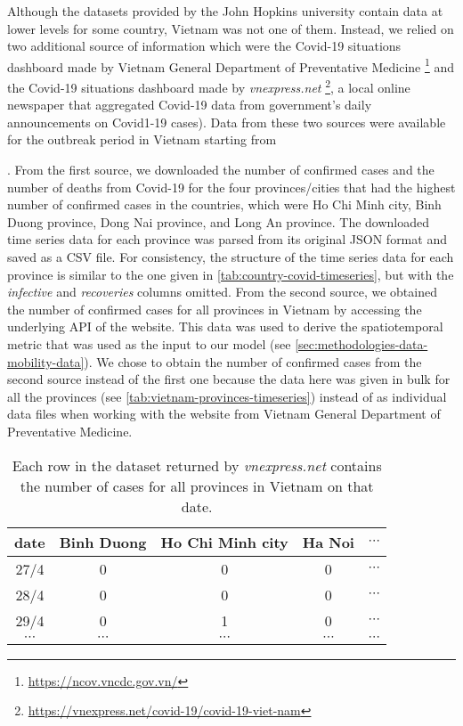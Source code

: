 Although the datasets provided by the John Hopkins university contain data at lower levels for some country, Vietnam was not one of them.
Instead, we relied on two additional source of information which were the Covid-19 situations dashboard made by Vietnam General Department of Preventative Medicine \footnote{\url{https://ncov.vncdc.gov.vn/}} and the Covid-19 situations dashboard made by \textit{vnexpress.net} \footnote{\url{https://vnexpress.net/covid-19/covid-19-viet-nam}}, a local online newspaper that aggregated Covid-19 data from government's daily announcements on Covid1-19 cases).
Data from these two sources were available for the outbreak period in Vietnam starting from \date{27th April 2021}.
From the first source, we downloaded the number of confirmed cases and the number of deaths from Covid-19 for the four provinces/cities that had the highest number of confirmed cases in the countries, which were Ho Chi Minh city, Binh Duong province, Dong Nai province, and Long An province.
The downloaded time series data for each province was parsed from its original \gls{JSON} format and saved as a \gls{CSV} file.
For consistency, the structure of the time series data for each province is similar to the one given in \autoref{tab:country-covid-timeseries}, but with the \textit{infective} and \textit{recoveries} columns omitted.
From the second source, we obtained the number of confirmed cases for all provinces in Vietnam by accessing the underlying \gls{API} of the website.
This data was used to derive the spatiotemporal metric that was used as the input to our model (see \autoref{sec:methodologies-data-mobility-data}).
We chose to obtain the number of confirmed cases from the second source instead of the first one because the data here was given in bulk for all the provinces (see \autoref{tab:vietnam-provinces-timeseries}) instead of as individual data files when working with the website from Vietnam General Department of Preventative Medicine.

\begin{table}[h]
\centering
\begin{tabular}{|c | c | c | c | c }
    date & Binh Duong & Ho Chi Minh city & Ha Noi & $\cdots$ \\
    \hline\hline
    27/4 & 0 & 0 & 0 & $\cdots$ \\
    \hline
    28/4 & 0 & 0 & 0 & $\cdots$ \\
    \hline
    29/4 & 0 & 1 & 0 & $\cdots$ \\
    \hline
    $\cdots$ & $\cdots$ & $\cdots$ & $\cdots$ & $\cdots$ \\
\end{tabular}
\caption{Each row in the dataset returned by \textit{vnexpress.net} contains the number of cases for all provinces in Vietnam on that date.}
\label{tab:vietnam-provinces-timeseries}
\end{table}

